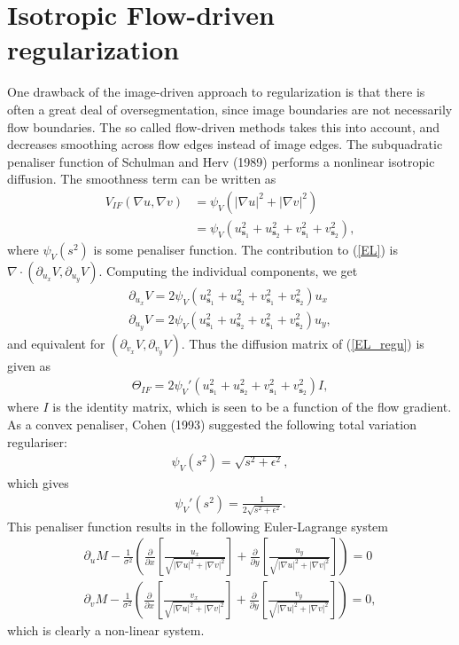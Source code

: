 \documentclass[10pt,a4paper]{article}
\begin{document}
\section{Isotropic Flow-driven regularization}
One drawback of the image-driven approach to regularization is that there is often a great deal of oversegmentation, since image boundaries are not necessarily flow boundaries. The so called flow-driven methods takes this into account, and decreases smoothing across flow edges instead of image edges. The subquadratic penaliser function of Schulman and Herv (1989) performs a nonlinear isotropic diffusion. The smoothness term can be written as
\begin{align*}
V_{IF}(\nabla u, \nabla v) &= \psi_V \left( |\nabla u|^2 + |\nabla v|^2 \right) \\ 
&= \psi_V \left( u_{\textbf{s}_1}^2 + u_{\textbf{s}_2}^2 + v_{\textbf{s}_1}^2 + v_{\textbf{s}_2}^2 \right),
\end{align*} 
where $\psi_V(s^2)$ is some penaliser function. The contribution to (\ref{EL}) is $\nabla \cdot (\partial_{u_x} V, \partial_{u_y} V)$. Computing the individual components, we get
\begin{align*}
\partial_{u_x} V = 2 \psi_V \left( u_{\textbf{s}_1}^2 + u_{\textbf{s}_2}^2 + v_{\textbf{s}_1}^2 + v_{\textbf{s}_2}^2 \right) u_x \\
\partial_{u_y} V = 2 \psi_V \left( u_{\textbf{s}_1}^2 + u_{\textbf{s}_2}^2 + v_{\textbf{s}_1}^2 + v_{\textbf{s}_2}^2 \right) u_y,
\end{align*}
and equivalent for $(\partial_{v_x} V, \partial_{v_y} V)$. Thus the diffusion matrix of (\ref{EL_regu}) is given as
\begin{align*}
\Theta_{IF} = 2 \psi_V'\left( u_{\textbf{s}_1}^2 + u_{\textbf{s}_2}^2 + v_{\textbf{s}_1}^2 + v_{\textbf{s}_2}^2 \right) I,
\end{align*}
where $I$ is the identity matrix, which is seen to be a function of the flow gradient. As a convex penaliser, Cohen (1993) suggested the following total variation regulariser:
\begin{align*}
\psi_V(s^2) = \sqrt{s^2 + \epsilon^2},
\end{align*} 
which gives
\begin{align*}
\psi_V'(s^2) = \frac{1}{2 \sqrt{s^2 + \epsilon^2}}.
\end{align*}
This penaliser function results in the following Euler-Lagrange system
\begin{equation}
\begin{aligned}
\label{EL_LD}
\partial_u M - \frac{1}{\sigma^2} \left(\frac{\partial}{\partial x}\left[ \frac{u_x}{\sqrt{|\nabla u|^2 + |\nabla v|^2}} \right] + \frac{\partial}{\partial y} \left[ \frac{u_y}{\sqrt{|\nabla u|^2 + |\nabla v|^2}} \right] \right) = 0 \\
\partial_v M - \frac{1}{\sigma^2} \left(\frac{\partial}{\partial x}\left[ \frac{v_x}{\sqrt{|\nabla u|^2 + |\nabla v|^2}} \right] + \frac{\partial}{\partial y} \left[ \frac{v_y}{\sqrt{|\nabla u|^2 + |\nabla v|^2}} \right] \right) = 0,
\end{aligned}
\end{equation}
which is clearly a non-linear system.
\end{document}
